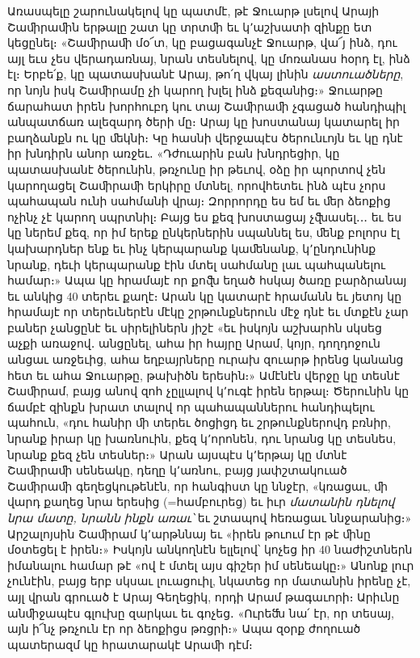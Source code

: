 \documentclass{article}
\begin{document}
{Առասպելը շարունակելով կը պատմէ, թէ Ջուարթ լսելով Արայի Շաﬕրաﬕն երթալը շատ կը տրտﬕ եւ կ՚աշխատի զինքը ետ կեցընել։ «Շաﬕրաﬕ մօ՜տ, կը բացագանչէ Ջուարթ, վա՜յ ինձ, դու այլ եւս չես վերադառնայ, նրան տեսնելով, կը մոռանաս հօրդ էլ, ինձ էլ։ Երբե՛ք, կը պատասխանէ Արայ, թո՛ղ վկայ լինին \emph{աստուածները}, որ նոյն իսկ Շաﬕրամը չի կարող խլել ինձ քեզանից։» Ջուարթը ճարահատ իրեն խորհուբդ կու տայ Շաﬕրաﬕ չգացած հանդիպիլ անպատճառ ալեզարդ ծերի մը։ Արայ կը խոստանայ կատարել իր բաղձանքն ու կը ﬔկնի։ Կը հասնի վերջապէս ծերունւոյն եւ կը դնէ իր խնդիրն անոր առջեւ․ «Դժուարին բան խնդրեցիր, կը պատասխանէ ծերունին, թռչունը իր թեւով, օձը իր պորտով չեն կարողացել Շաﬕրաﬕ երկիրը մտնել, որովհետեւ ինձ պէս չորս պահապան ունի սահմանի վրայ։ Զորրորդը ես եմ եւ ﬔր ձեոքից ոչինչ չէ կարող սպրտնիլ։ Բայց ես քեզ խոստացայ չﬖասել․․․ եւ ես կը ներեմ քեզ, որ իմ երեք ընկերներին սպաննել ես, ﬔնք բոլորս էլ կախարդներ ենք եւ ինչ կերպարանք կաﬔնանք, կ՚ընդունինք նրանք, դեւի կերպարանք էին մտել սահմանը լաւ պահպանելու համար։» Ապա կը հրամայէ որ քոﬖ եղած հսկայ ծառը բարձրանայ եւ անկից 40 տերեւ քաղէ։ Արան կը կատարէ հրամանն եւ յետոյ կը հրամայէ որ տերեւներէն մէկը շրթունքներուն մէջ դնէ եւ մտքէն չար բաներ չանցընէ եւ սիրելիներն յիշէ «եւ իսկոյն աշխարհն սկսեց աչքի առաջով․ անցընել, ահա իր հայրը Արամ, կոյր, դողդոջուն անցաւ առջեւից, ահա եղբայրները ուրախ զուարթ իրենց կանանց հետ եւ ահա Ջուարթը, թախիծն երեսին։» Ամէնէն վերջը կը տեսնէ Շաﬕրամ, բայց անով զոհ չըլլալով կ՚ուգէ իրեն երթալ։ Ծերունին կը ճամբէ զինքն խրատ տալով որ պահապաններու հանդիպելու պահուն, «դու հանիր ﬕ տերեւ ծոցիցդ եւ շրթունքներովդ բռնիր, նրանք իրար կը խառնուին, քեզ կ՚որոնեն, դու նրանց կը տեսնես, նրանք քեզ չեն տեսներ։» Արան այսպէս կ՚երթայ կը մտնէ Շաﬕրաﬕ սենեակը, դեղը կ՚առնու, բայց յափշտակուած Շաﬕրաﬕ գեղեցկութենէն, որ հանգիստ կը ննջէր, «կռացաւ, ﬕ վարդ քաղեց նրա երեսից (=համբուրեց) եւ իւր \emph{մատանին դնելով նրա մատը, նրանն ինքն առաւ՝} եւ շտապով հեռացաւ ննջարանից։» Արշալոյսին Շաﬕրամ կ՚արթննայ եւ «իրեն թուում էր թէ ﬕնը մօտեցել է իրեն։» Իսկոյն անկողնէն ելլելով՝ կոչեց իր 40 նաժիշտներն իմանալու համար թէ «ով է մտել այս գիշեր իմ սենեակը։» Անոնք լուր չունէին, բայց երբ սկսաւ լուացուիլ, նկատեց որ մատանին իրենը չէ, այլ վրան գրուած է Արայ Գեղեցիկ, որդի Արամ թագաւորի։ Արիւնը անﬕջապէս գլուխը զարկաւ եւ գոչեց․ «Ուրեﬓ նա՛ էր, որ տեսայ, այն ի՜նչ թռչուն էր որ ձեոքիցս թռցրի։» Ապա զօրք ժողուած պատերազմ կը հրատարակէ Արաﬕ դէմ։

}
\end{document}
